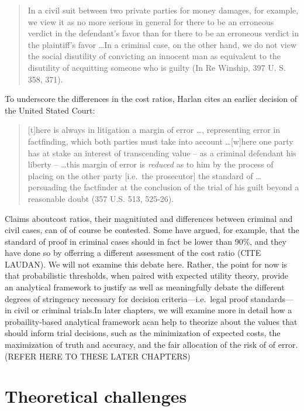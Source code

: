 \documentclass[10pt,dvipsnames,enabledeprecatedfontcommands]{scrartcl}
\begin{document}
\begin{quote}

In a civil suit between two private parties for money damages, for example, we view it as no more serious in general for there to be an erroneous verdict in the defendant's favor than for there to be an erroneous verdict in the plaintiff's favor \dots In a criminal case, on the other hand, we do not view the social disutility of convicting an innocent man as equivalent to the disutility of acquitting someone who is guilty (In Re Winship, 397 U. S. 358, 371).

\end{quote}

To underscore the differences in the cost ratios, Harlan cites an
earlier decision of the United Stated Court:

\begin{quote}
[t]here is always in litigation a margin of error \dots, representing error in factfinding, which both parties must take into account \dots [w]here one party has at stake an interest of transcending value -- as a criminal defendant his liberty -- \dots this margin of error is \textit{reduced} as to him by the process of placing on the other 
party [i.e.\ the prosecutor] the standard of \dots persuading the factfinder at the conclusion of the trial of his guilt beyond a reasonable doubt (357 U.S. 513, 525-26).
\end{quote}

Claims aboutcost ratios, their magnitiuted and differences between
criminal and civil cases, can of of course be contested. Some have
argued, for example, that the standard of proof in criminal cases should
in fact be lower than 90\%, and they have done so by offerring a
different assessment of the cost ratio (CITE LAUDAN). We will not
examine this debate here. Rather, the point for now is that
probabilistic thresholds, when paired with expected utility theory,
provide an analytical framework to justify as well as meaningfully
debate the different degrees of stringency necessary for decision
criteria---i.e.~legal proof standards---in civil or criminal trials.In
later chapters, we will examine more in detail how a probaility-based
analytical framework acan help to theorize about the values that should
inform trial decisions, such as the minimization of expected costs, the
maximization of truth and accuracy, and the fair allocation of the risk
of of error. (REFER HERE TO THESE LATER CHAPTERS)

\section{Theoretical challenges}\label{theoretical-challenges}
\end{document}
